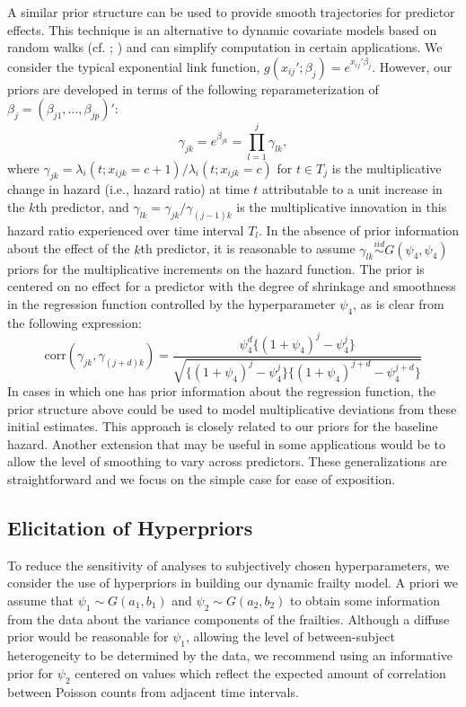 \documentclass[10pt, letterpaper]{article}
\begin{document}
A similar prior structure can be used to provide smooth trajectories for predictor effects. This technique is an alternative to dynamic covariate models based on random walks (cf. \citealp{Gamerman1991}; \citealp{Sargent1997}) and can simplify computation in certain applications. We consider the typical exponential link function, $g(x_{ij}'; \beta_j) = e^{x_{ij}' \beta_j}$. However, our priors are developed in terms of the following reparameterization of $\beta_j = (\beta_{j1}, \dots, \beta_{jp})'$:
\[
\gamma_{jk} = e^{\beta_{jk}} = \prod_{l=1}^{j} \gamma_{lk},
\]
where $\gamma_{jk} = \lambda_i(t; x_{ijk} = c+1) / \lambda_i(t; x_{ijk} = c)$ for $t \in T_j$ is the multiplicative change in hazard (i.e., hazard ratio) at time $t$ attributable to a unit increase in the $k$th predictor, and $\gamma_{lk} = \gamma_{jk} / \gamma_{(j-1)k}$ is the multiplicative innovation in this hazard ratio experienced over time interval $T_l$. In the absence of prior information about the effect of the $k$th predictor, it is reasonable to assume $\gamma_{lk} \stackrel{iid}{\sim} G(\psi_4, \psi_4)$ priors for the multiplicative increments on the hazard function. The prior is centered on no effect for a predictor with the degree of shrinkage and smoothness in the regression function controlled by the hyperparameter $\psi_4$, as is clear from the following expression:
\begin{equation} \label{eq:7}
\text{corr}(\gamma_{jk}, \gamma_{(j+d)k}) = \frac{\psi_4^d \{ (1 + \psi_4)^j - \psi_4^j \}}{\sqrt{\{ (1 + \psi_4)^j - \psi_4^j \} \{ (1 + \psi_4)^{j+d} - \psi_4^{j+d} \}}}
\end{equation}
In cases in which one has prior information about the regression function, the prior structure above could be used to model multiplicative deviations from these initial estimates. This approach is closely related to our priors for the baseline hazard. Another extension that may be useful in some applications would be to allow the level of smoothing to vary across predictors. These generalizations are straightforward and we focus on the simple case for ease of exposition.

\subsection{Elicitation of Hyperpriors}

To reduce the sensitivity of analyses to subjectively chosen hyperparameters, we consider the use of hyperpriors in building our dynamic frailty model. A priori we assume that $\psi_1 \sim G(a_1, b_1)$ and $\psi_2 \sim G(a_2, b_2)$ to obtain some information from the data about the variance components of the frailties. Although a diffuse prior would be reasonable for $\psi_1$, allowing the level of between-subject heterogeneity to be determined by the data, we recommend using an informative prior for $\psi_2$ centered on values which reflect the expected amount of correlation between Poisson counts from adjacent time intervals.
\end{document}
